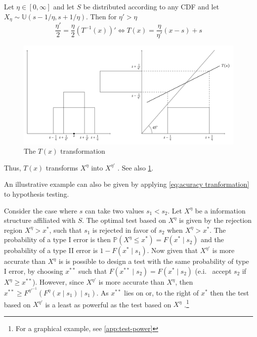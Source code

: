 \documentclass[10pt,a4paper]{article} 					%
\begin{document}
\begin{example}\label{ex:t-transformation-1}
Let  $\eta\in[0,\infty]$ and let $S$ be distributed according to any CDF and let $X_{\eta}\sim\mathbb{U}(s-1/\eta,s+1/\eta)$. Then for $\eta'>\eta$
\[
\frac{\eta'}{2}=\frac{\eta}{2}\left(T^{-1}(x)\right)'\Leftrightarrow T(x)=\frac{\eta}{\eta'}(x-s)+s
\]
\begin{figure}
	\includegraphics[width=\textwidth]{../fig/t-transformation.pdf}
	\caption{\label{fig:t-transformation}The $T(x)$ transformation}
\end{figure}

Thus, $T(x)$ transforms $X^{\eta}$ into $X^{\eta'}$ \citep{Persico1996}. See also \cref{fig:t-transformation}.
\end{example}
An illustrative example can also be given by applying \cref{eq:acuracy tranformation} to hypothesis testing.

\begin{example}\label{ex:t-transformation-2}
Consider the case where $s$ can take two values $s_{1}<s_{2}$. Let $X^{\eta}$ be a information structure affiliated with $S$. The optimal test based on $X^{\eta}$ is given by the rejection region $X^{\eta}>x^{*}$, such that $s_{1}$ is rejected in favor of $s_{2}$ when $X^{\eta}>x^{*}$. The probability of a type I error is then $\mathbb{P}(X^{\eta}\le x^{*})=F(x^{*}\mid s_{2})$ and the probability of a type II error is $1-F(x^{*}\mid s_{1})$. Now given that $X^{\eta'}$ is more accurate than $X^{\eta}$ is is possible to design a test with the same probability of type I error, by choosing $x^{**}$ such that $F(x^{**}\mid s_{2})=F(x^{*}\mid s_{2})$ (e.i. \ accept $s_{2}$ if $X^{\eta}\ge x^{**}$). However, since $X^{\eta'}$ is more accurate than $X^{\eta}$, then $x^{**}\ge F^{\eta'^{-1}}(F^{\eta}(x\mid s_{1})\mid s_{1})$. As $x^{**}$ lies on or, to the right of $x^{*}$ then the test based on $X^{\eta'}$ is a least as powerful as the test based on $X^{\eta}$
\citep{Lehmann1988,Persico2000}.\footnote{For a graphical example, see \cref{app:test-power}}
\end{example}
\end{document}

